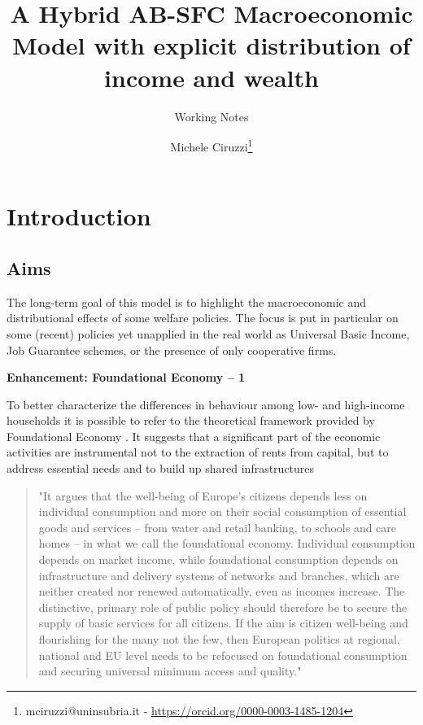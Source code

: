 \documentclass[a4paper, headings=standardclasses]{scrartcl}
\title{A Hybrid AB-SFC Macroeconomic Model with explicit distribution of income and wealth \let\thefootnote\relax\footnotetext{
	An updated version of this paper and all the source code and the instructions required to replicate the paper are available at \url{https://github.com/TnTo/FE/}

	\hl{Highlighted} parts of the text indicate substantial choices to be taken.
  }}
\subtitle{Working Notes}
\author{Michele Ciruzzi\thanks{mciruzzi@uninsubria.it - \url{https://orcid.org/0000-0003-1485-1204}}}
\newenvironment{enh}[1][]{\begin{framed}\noindent\textbf{Enhancement: #1}\par}{\end{framed}}
\begin{document}
\maketitle


\section{Introduction}
\subsection{Aims}
The long-term goal of this model is to highlight the macroeconomic and distributional effects of some welfare policies.
The focus is put in particular on some (recent) policies yet unapplied in the real world as Universal Basic Income, Job Guarantee schemes, or the presence of only cooperative firms.

\begin{enh}[Foundational Economy -- 1]
	To better characterize the differences in behaviour among low- and high-income households it is possible to refer to the theoretical framework provided by Foundational Economy \parencite{arcidiacono2018}. It suggests that a significant part of the economic activities are instrumental not to the extraction of rents from capital, but to address essential needs and to build up shared infrastructures
	\begin{quote}
		"It argues that the well-being of Europe's citizens depends less on individual consumption and more on their social consumption of essential goods and services – from water and retail banking, to schools and care homes – in what we call the foundational economy. Individual consumption depends on market income, while foundational consumption depends on infrastructure and delivery systems of networks and branches, which are neither created nor renewed automatically, even as incomes increase. The distinctive, primary role of public policy should therefore be to secure the supply of basic services for all citizens. If the aim is citizen well-being and flourishing for the many not the few, then European politics at regional, national and EU level needs to be refocused on foundational consumption and securing universal minimum access and quality." \parencite{arcidiacono2018}
	\end{quote}
\end{enh}
\end{document}
